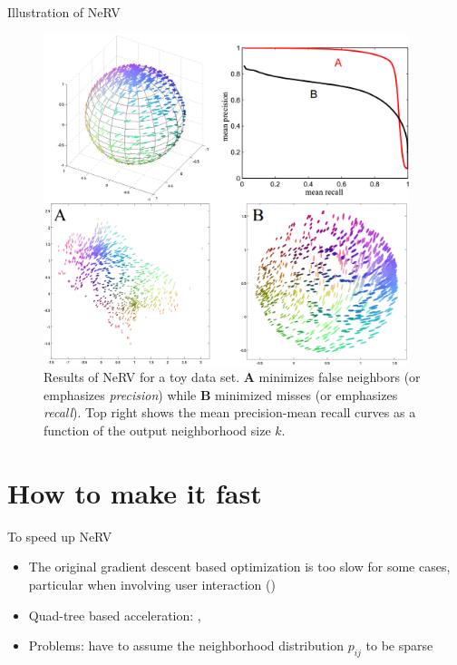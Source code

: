 \documentclass[first=dgreen,second=purple,logo=yellowexc]{aaltoslides}
\begin{document}
\begin{frame}{Illustration of NeRV}
\begin{figure}
\begin{columns}
\begin{column}{0.65\textwidth}
\includegraphics[width=\textwidth]{figures/demo.png}
\end{column}
\begin{column}{0.3\textwidth}
\caption{\scriptsize{Results of NeRV for a toy data set. \textbf{A} minimizes false neighbors (or emphasizes \emph{precision}) while \textbf{B} minimized misses (or emphasizes \emph{recall}). Top right shows the mean precision-mean recall curves as a function of the output neighborhood size $k$.}}
\end{column}
\end{columns}
\end{figure}
\end{frame}

\section{How to make it fast}
\begin{frame}{To speed up NeRV}
\begin{itemize}
\item The original gradient descent based optimization is too slow for some cases, particular when involving user interaction (\cite{peltonen13eurovis})
\item Quad-tree based acceleration: \cite{yang13icml}, \cite{vandermaaten13iclr}
\item Problems: have to assume the neighborhood distribution $p_{ij}$ to be sparse
\end{itemize}
\end{frame}
\end{document}
